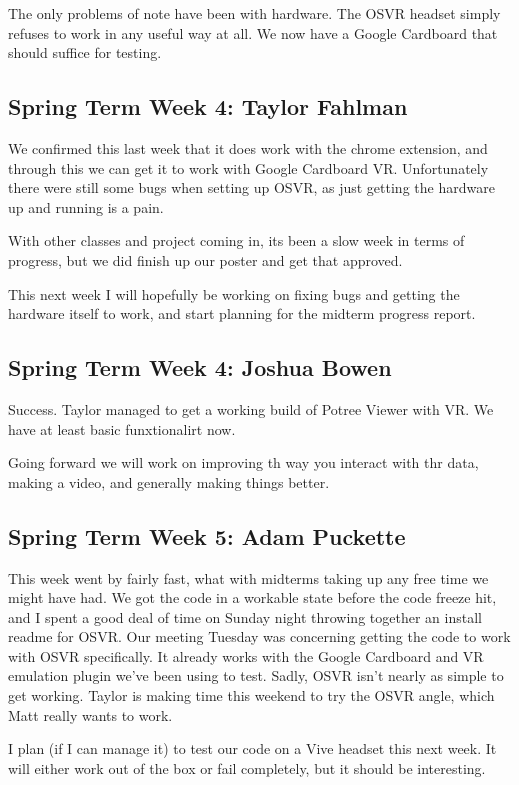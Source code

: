 \documentclass[draftclsnofoot,onecolumn]{IEEEtran}
\begin{document}
The only problems of note have been with hardware. The OSVR headset simply refuses to work in any useful way at all. We now have a Google Cardboard that should suffice for testing.

\subsection{Spring Term Week 4: Taylor Fahlman}

We confirmed this last week that it does work with the chrome extension, and through this we can get it to work with Google Cardboard VR. Unfortunately there were still some bugs when setting up OSVR, as just getting the hardware up and running is a pain.

With other classes and project coming in, its been a slow week in terms of progress, but we did finish up our poster and get that approved.

This next week I will hopefully be working on fixing bugs and getting the hardware itself to work, and start planning for the midterm progress report.

\subsection{Spring Term Week 4: Joshua Bowen}

Success. Taylor managed to get a working build of Potree Viewer with VR. We have at least basic funxtionalirt now.

Going forward we will work on improving th way you interact with thr data, making a video, and generally making things better.

\subsection{Spring Term Week 5: Adam Puckette}

This week went by fairly fast, what with midterms taking up any free time we might have had. We got the code in a workable state before the code freeze hit, and I spent a good deal of time on Sunday night throwing together an install readme for OSVR. Our meeting Tuesday was concerning getting the code to work with OSVR specifically. It already works with the Google Cardboard and VR emulation plugin we've been using to test. Sadly, OSVR isn't nearly as simple to get working. Taylor is making time this weekend to try the OSVR angle, which Matt really wants to work.

I plan (if I can manage it) to test our code on a Vive headset this next week. It will either work out of the box or fail completely, but it should be interesting.
\end{document}
